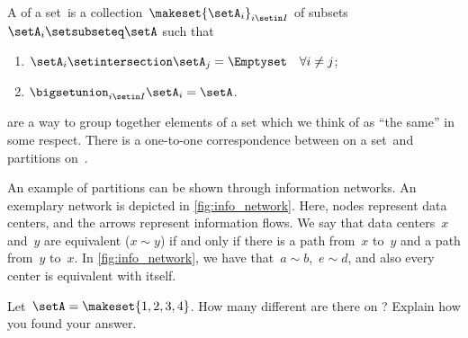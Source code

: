 \begin{ctdefinition}[Partition]
    \label{def:partition}
    A  of a set~\setA is a collection~$\makeset{\setA_i}_{i\setin I}$ of subsets~$\setA_i\setsubseteq \setA$ such that
    \begin{enumerate}
        \item $\setA_i\setintersection \setA_j=\Emptyset \quad \forall i\neq j$;
        \item $\bigsetunion_{i\setin I}\setA_i=\setA$.
    \end{enumerate}
\end{ctdefinition}

\begin{remark}
     are a way to group together elements of a set which we think of as ``the same'' in some respect.
    There is a one-to-one correspondence between  on a set~\setA and partitions on~\setA.
\end{remark}

\begin{marginfigure}
    \centering
    \caption{
        \label{fig:info_network}
    }
\end{marginfigure}

\begin{example}
    An example of partitions can be shown through information networks.
    An exemplary network is depicted in \cref{fig:info_network}.
    Here, nodes represent data centers, and the arrows represent information flows.
    We say that data centers~$x$ and~$y$ are equivalent ($x\sim y$) if and only if there is a path from~$x$ to~$y$ and a path from~$y$ to~$x$.
    In \cref{fig:info_network}, we have that~$a\sim b$,~$e\sim d$, and also every center is equivalent with itself.
\end{example}

\vfill
\begin{gradedexercise}
    \label{ex:CountingEquivalenceRelations}
    Let~$\setA = \makeset{ 1, 2, 3, 4 }$.
    How many different  are there on \setA?
    Explain how you found your answer.
\end{gradedexercise}

